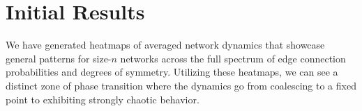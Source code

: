 
\section{Initial Results}
\label{sec:Initial Results}

We have generated heatmaps of averaged network dynamics that showcase general patterns for size-$n$ networks across the full spectrum of edge connection probabilities and degrees of symmetry. Utilizing these heatmaps, we can see a distinct zone of phase transition where the dynamics go from coalescing to a fixed point to exhibiting strongly chaotic behavior.
